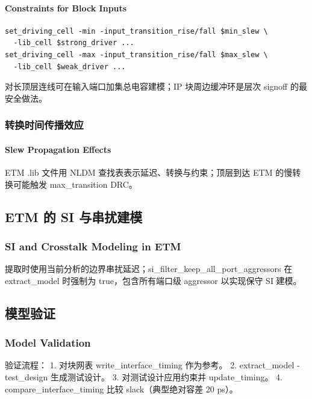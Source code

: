 \paragraph*{Constraints for Block Inputs}

\begin{lstlisting}
set_driving_cell -min -input_transition_rise/fall $min_slew \
  -lib_cell $strong_driver ...
set_driving_cell -max -input_transition_rise/fall $max_slew \
  -lib_cell $weak_driver ...
\end{lstlisting}

对长顶层连线可在输入端口加集总电容建模；IP 块周边缓冲环是层次 signoff 的最安全做法。


\subsubsection{转换时间传播效应}
\paragraph*{Slew Propagation Effects}

ETM .lib 文件用 NLDM 查找表表示延迟、转换与约束；顶层到达 ETM 的慢转换可能触发 max_transition DRC。

\subsection{ETM 的 SI 与串扰建模}
\subsubsection*{SI and Crosstalk Modeling in ETM}

提取时使用当前分析的边界串扰延迟；si_filter_keep_all_port_aggressors 在 extract_model 时强制为 true，包含所有端口级 aggressor 以实现保守 SI 建模。

\subsection{模型验证}
\subsubsection*{Model Validation}

验证流程：
1. 对块网表 write_interface_timing 作为参考。
2. extract_model -test_design 生成测试设计。
3. 对测试设计应用约束并 update_timing。
4. compare_interface_timing 比较 slack（典型绝对容差 20 ps）。

